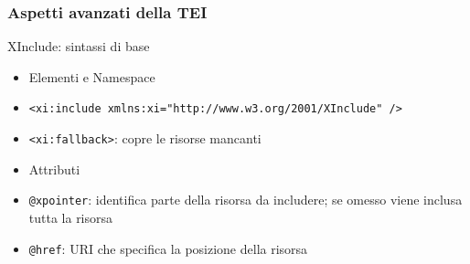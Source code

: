     \begin{frame}
        \frametitle{Aspetti avanzati della TEI}
        \addtocounter{nframe}{1}

        \begin{block}{XInclude: sintassi di base}
            \begin{itemize}
                \item Elementi e Namespace
                \item [] \texttt{<xi:include xmlns:xi="http://www.w3.org/2001/XInclude" />}
                \item [] \texttt{<xi:fallback>}: copre le risorse mancanti
                \item Attributi
                \item [] \texttt{@xpointer}: identifica parte della risorsa da includere; se omesso viene inclusa tutta la risorsa
                \item [] \texttt{@href}: URI che specifica la posizione della risorsa
            \end{itemize}
        \end{block}
        
    \end{frame}

